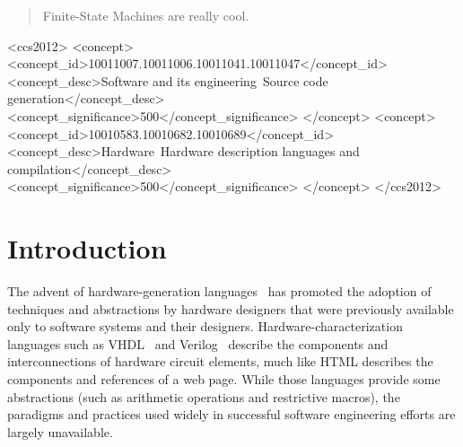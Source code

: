 \documentclass[sigplan,anonymous,review]{acmart}
\begin{document}
\begin{abstract}
  Finite-State Machines are really cool.
\end{abstract}

\begin{CCSXML}
<ccs2012>
<concept>
<concept_id>10011007.10011006.10011041.10011047</concept_id>
<concept_desc>Software and its engineering~Source code generation</concept_desc>
<concept_significance>500</concept_significance>
</concept>
<concept>
<concept_id>10010583.10010682.10010689</concept_id>
<concept_desc>Hardware~Hardware description languages and compilation</concept_desc>
<concept_significance>500</concept_significance>
</concept>
</ccs2012>
\end{CCSXML}



\maketitle

\section{Introduction}

The advent of hardware-generation languages~\cite{chisel:article} has promoted the adoption of techniques and abstractions by hardware designers that were previously available only to software systems and their designers. Hardware-characterization languages such as VHDL~\cite{vhdl} and Verilog~\cite{verilog} describe the components and interconnections of hardware circuit elements, much like HTML describes the components and references of a web page. While those languages provide some abstractions (such as arithmetic operations and restrictive macros), the paradigms and practices used widely in successful software engineering efforts are largely unavailable.
\end{document}
